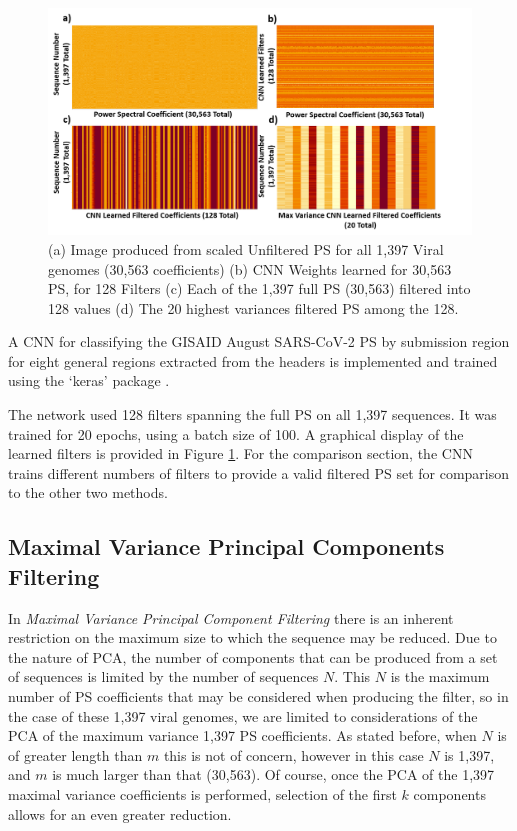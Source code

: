 \documentclass[10pt,conference]{IEEEtran}
\begin{document}
\begin{figure}[h!]
\centering
\includegraphics[scale=0.34]{Images/Files/CNNFilters.png}
\caption{(a) Image produced from scaled Unfiltered PS for all 1,397 Viral genomes (30,563 coefficients) (b) CNN Weights learned for 30,563 PS, for 128 Filters (c) Each of the 1,397 full PS (30,563) filtered into 128 values (d) The 20 highest variances filtered PS among the 128.  \label{fig:CNN128Filts}}
\end{figure}

A CNN for classifying the GISAID August SARS-CoV-2 PS by submission region for eight general regions extracted from the headers is implemented and trained using the `keras' package \cite{kerR21}.

The network used 128 filters spanning the full PS on all 1,397 sequences. 
It was trained for 20 epochs, using a batch size of 100.  
A graphical display of the learned filters is provided in Figure \ref{fig:CNN128Filts}.
For the comparison section, the CNN trains different numbers of filters to provide a 
valid filtered PS set for comparison to the other two methods. 
\subsection{Maximal Variance Principal Components Filtering}

In \textit{Maximal Variance Principal Component Filtering} there is an inherent 
restriction on the maximum size to which the sequence may be reduced.
Due to the nature of PCA, the number of components that can be produced from a set of sequences is limited by the number of sequences $N$.  
This $N$ is the maximum number of PS coefficients that may be considered when 
producing the filter, so in the case of these 1,397 viral genomes, we are limited to 
considerations of the PCA of the maximum variance 1,397 PS coefficients. 
As stated before, when $N$ is of greater length than $m$ this is not of concern, 
however in this case $N$ is 1,397, and $m$ is much larger than that (30,563). 
Of course, once the PCA of the 1,397 maximal variance coefficients is performed, 
selection of the first $k$ components allows for an even greater reduction.
\end{document}
